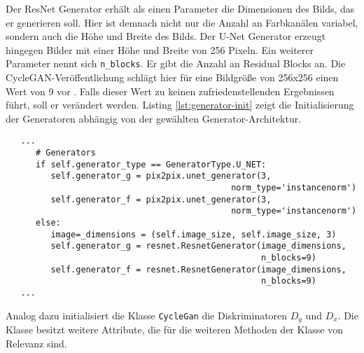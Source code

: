 Der ResNet Generator erhält als einen Parameter die Dimensionen des Bilds, das er generieren soll. Hier ist demnach nicht nur die Anzahl an Farbkanälen variabel, sondern auch die Höhe und Breite des Bilds. Der U-Net Generator erzeugt hingegen Bilder mit einer Höhe und Breite von 256 Pixeln. Ein weiterer Parameter nennt sich \texttt{n_blocks}. Er gibt die Anzahl an Residual Blocks an. Die \ac{CycleGAN}-Veröffentlichung schlägt hier für eine Bildgröße von 256x256 einen Wert von 9 vor \cite{cycleGAN}. Falls dieser Wert zu keinen zufriedenstellenden Ergebnissen führt, soll er verändert werden. Listing \ref{lst:generator-init} zeigt die Initialisierung der Generatoren abhängig von der gewählten Generator-Architektur.

\begin{code}
	\begin{verbatim}
   ...
      # Generators
      if self.generator_type == GeneratorType.U_NET:
         self.generator_g = pix2pix.unet_generator(3, 
                                             norm_type='instancenorm')
         self.generator_f = pix2pix.unet_generator(3, 
                                             norm_type='instancenorm')
      else:
         image=_dimensions = (self.image_size, self.image_size, 3)
         self.generator_g = resnet.ResnetGenerator(image_dimensions, 
                                                   n_blocks=9)
         self.generator_f = resnet.ResnetGenerator(image_dimensions, 
                                                   n_blocks=9)
   ...
   \end{verbatim}
   \label{lst:generator-init}
\end{code}

Analog dazu initialisiert die Klasse \texttt{CycleGan} die Diskriminatoren $D_y$ und $D_x$. Die Klasse besitzt weitere Attribute, die für die weiteren Methoden der Klasse von Relevanz sind.

